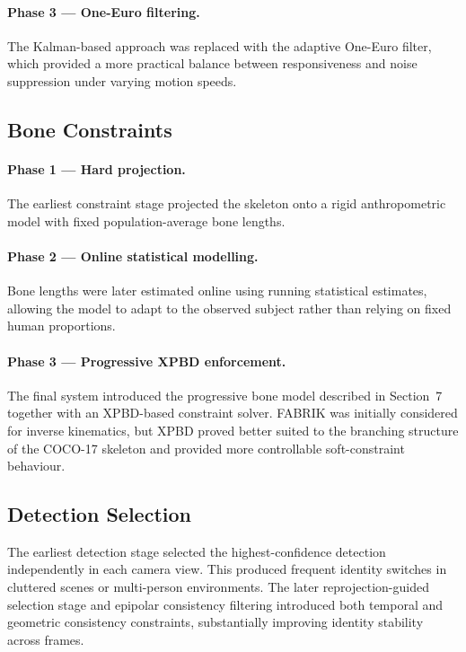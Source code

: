 \documentclass[11pt,a4paper]{article}
\begin{document}
\paragraph{Phase 3 — One-Euro filtering.}
The Kalman-based approach was replaced with the adaptive One-Euro filter, which
provided a more practical balance between responsiveness and noise suppression
under varying motion speeds.

\subsection{Bone Constraints}

\paragraph{Phase 1 — Hard projection.}
The earliest constraint stage projected the skeleton onto a rigid anthropometric
model with fixed population-average bone lengths.

\paragraph{Phase 2 — Online statistical modelling.}
Bone lengths were later estimated online using running statistical estimates,
allowing the model to adapt to the observed subject rather than relying on fixed
human proportions.

\paragraph{Phase 3 — Progressive XPBD enforcement.}
The final system introduced the progressive bone model described in Section~7
together with an XPBD-based constraint solver. FABRIK was initially considered
for inverse kinematics, but XPBD proved better suited to the branching structure
of the COCO-17 skeleton and provided more controllable soft-constraint behaviour.

\subsection{Detection Selection}

The earliest detection stage selected the highest-confidence detection independently
in each camera view. This produced frequent identity switches in cluttered scenes
or multi-person environments. The later reprojection-guided selection stage and
epipolar consistency filtering introduced both temporal and geometric consistency
constraints, substantially improving identity stability across frames.
\end{document}
